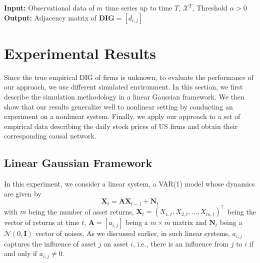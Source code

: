  \begin{algorithm}[h]
 \textbf{Input:} Observational data of $m$ time series up to time $T$, $\mathcal{X}^T$, Threshold $\alpha>0$\;
 \textbf{Output:} Adjacency matrix of $\textbf{DIG}=[d_{i,j}]$\;
 \label{alg}
\end{algorithm}


 
\section{Experimental Results}\label{sec:exp}

 Since the true empirical DIG of firms is unknown, to evaluate the performance of our approach, we use different simulated environment.
 In this section, we first describe the simulation methodology in a linear Gaussian framework. 
 We then show that our results generalize well to nonlinear setting by conducting an experiment on a nonlinear system. 
 Finally, we apply our approach to a set of empirical data describing the daily stock prices of US firms and obtain their corresponding causal network. 
 
 \subsection{Linear Gaussian Framework} \label{linfr}
 In this experiment, we consider a linear system, a VAR(1) model whose dynamics are given by 
\begin{equation}\label{eq:ex_lin}
    \textbf{X}_t = \textbf{A} \textbf{X}_{t-1} + \textbf{N}_t
\end{equation}
with $m$ being the number of asset returns, $\textbf{X}_t = (X_{1,t}, X_{2,t}, ... , X_{m,t})^\top$ being the vector of returns at time $t$, $\textbf{A}=[a_{i,j}]$ being a $m\times m$ matrix and $\textbf{N}_t$ being a $\mathcal{N}(0,\textbf{I})$ vector of noises. 
As we discussed earlier, in such linear systems, $a_{i,j}$ captures the influence of asset $j$ on asset $i$, i.e., there is an influence from $j$ to $i$ if and only if $a_{i,j}\neq0$.

